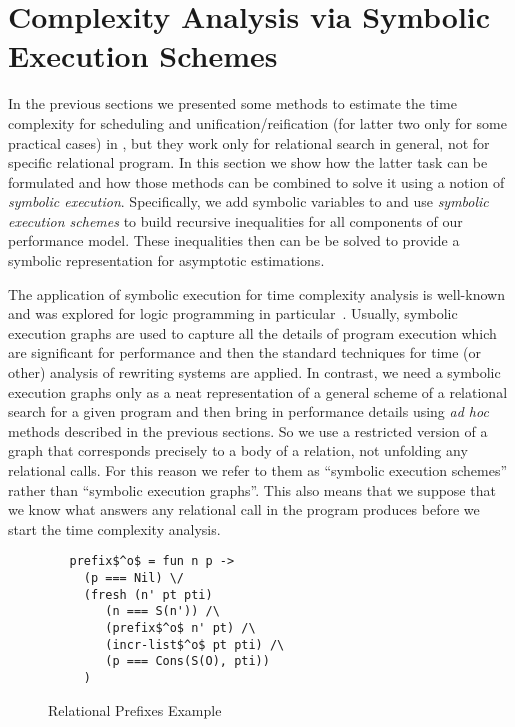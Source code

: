 \section{Complexity Analysis via Symbolic Execution Schemes}
\label{sec:symbolic}

In the previous sections we presented some methods to estimate the time complexity for scheduling and unification/reification (for latter two only for some practical cases) in \mK, but they work
only for relational search in general, not for specific relational program. In this section we show how the latter task can be formulated and how those methods can be combined to solve
it using a notion of \emph{symbolic execution}.
Specifically, we add symbolic variables to \mK and use \emph{symbolic execution schemes} to build recursive inequalities for all components of our performance model.
These inequalities then can be be solved to provide a symbolic representation for asymptotic estimations.

The application of symbolic execution for time complexity analysis is well-known and was explored for logic programming in particular~\cite{SymbolicExecutionForAnalysis}.
Usually, symbolic execution graphs are used to capture all the details of program execution which are significant for performance and then the standard techniques for time (or other)
analysis of rewriting systems are applied. In contrast, we need a symbolic execution graphs only as a neat representation of a general scheme of a relational search for a
given program and then bring in performance details using \emph{ad hoc} methods described in the previous sections. So we use a restricted version of a graph that corresponds
precisely to a body of a relation, not unfolding any relational calls. For this reason we refer to them as ``symbolic execution schemes'' rather than ``symbolic execution graphs''.
This also means that we suppose that we know what answers any relational call in the program produces before we start the time complexity analysis.

\begin{figure}[t]
\begin{lstlisting}
   prefix$^o$ = fun n p ->
     (p === Nil) \/
     (fresh (n' pt pti)
        (n === S(n')) /\
        (prefix$^o$ n' pt) /\
        (incr-list$^o$ pt pti) /\
        (p === Cons(S(O), pti))
     )
\end{lstlisting}

\caption{Relational Prefixes Example}
\label{fig:prefixo_definition}
\end{figure}

